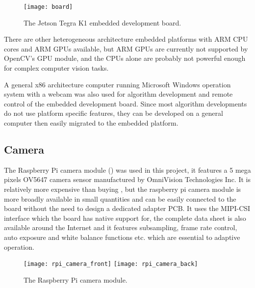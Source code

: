 \begin{figure}[htb]
  \centering
  \texttt{[image: board]}
  \caption{The Jetson Tegra K1 embedded development board.}
  \label{des:board}
\end{figure}

There are other heterogeneous architecture embedded platforms with ARM CPU cores and ARM GPUs available, but ARM GPUs are currently not supported by OpenCV's GPU module, and the CPUs alone are probably not powerful enough for complex computer vision tasks.


A general x86 architecture computer running Microsoft Windows operation system with a webcam was also used for algorithm development and remote control of the embedded development board. Since most algorithm developments do not use platform specific features, they can be developed on a general computer then easily migrated to the embedded platform.

\subsection{Camera}


The Raspberry Pi camera module () was used in this project, it features a 5 mega pixels OV5647 camera sensor manufactured by OmniVision Technologies Inc. It is relatively more expensive than buying , but the raspberry pi camera module is more broadly available in small quantities and can be easily connected to the board without the need to design a dedicated adapter PCB. It uses the MIPI-CSI interface which the board has native support for, the complete data sheet is also available around the Internet and it features subsampling, frame rate control, auto exposure and white balance functions etc. which are essential to adaptive operation.

\begin{figure}[htb]
  \centering
  \texttt{[image: rpi\_camera\_front]}
  \texttt{[image: rpi\_camera\_back]}
  \caption{The Raspberry Pi camera module.}
  \label{des:cam}
\end{figure}

